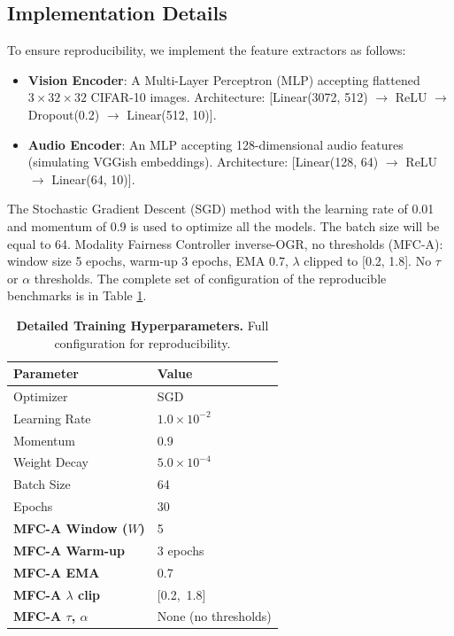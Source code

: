 \documentclass[fleqn,10pt]{wlscirep}
\begin{document}
\subsection{Implementation Details}
To ensure reproducibility, we implement the feature extractors as follows:
\begin{itemize}
    \item \textbf{Vision Encoder}: A Multi-Layer Perceptron (MLP) accepting flattened $3 \times 32 \times 32$ CIFAR-10 images. Architecture: [Linear(3072, 512) $\rightarrow$ ReLU $\rightarrow$ Dropout(0.2) $\rightarrow$ Linear(512, 10)].
    \item \textbf{Audio Encoder}: An MLP accepting 128-dimensional audio features (simulating VGGish embeddings). Architecture: [Linear(128, 64) $\rightarrow$ ReLU $\rightarrow$ Linear(64, 10)].
\end{itemize}
The Stochastic Gradient Descent (SGD) method with the learning rate of 0.01 and momentum of 0.9 is used to optimize all the models. The batch size will be equal to 64. Modality Fairness Controller inverse-OGR, no thresholds (MFC-A):  window size 5 epochs, warm-up 3 epochs, EMA 0.7, $\lambda$ clipped to [0.2, 1.8]. No $\tau$ or $\alpha$ thresholds. The complete set of configuration of the reproducible benchmarks is in Table \ref{tab:hyperparams_main}.

\begin{table}[h]
\caption{\textbf{Detailed Training Hyperparameters.} Full configuration for reproducibility.}
\label{tab:hyperparams_main}
\centering
\begin{tabular}{@{}ll@{}}
\toprule
\textbf{Parameter} & \textbf{Value} \\ \midrule
Optimizer & SGD \\
Learning Rate & $1.0 \times 10^{-2}$ \\
Momentum & 0.9 \\
Weight Decay & $5.0 \times 10^{-4}$ \\
Batch Size & 64 \\
Epochs & 30 \\
\textbf{MFC-A Window ($W$)} & 5 \\
\textbf{MFC-A Warm-up} & 3 epochs \\
\textbf{MFC-A EMA} & 0.7 \\
\textbf{MFC-A $\lambda$ clip} & [0.2,\ 1.8] \\
\textbf{MFC-A $\tau$, $\alpha$} & None (no thresholds) \\ \bottomrule
\end{tabular}
\end{table}
\end{document}
